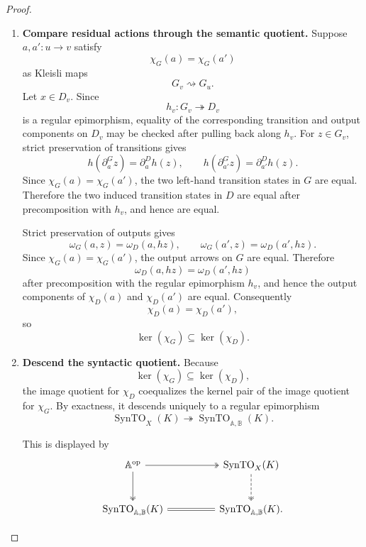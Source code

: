\begin{proof}
    \leavevmode
    \begin{enumerate}
        \item \textbf{Compare residual actions through the semantic quotient.}
        Suppose \(a,a':u\to v\) satisfy
        \[
            \chi_G(a)=\chi_G(a')
        \]
        as Kleisli maps
        \[
            G_v\rightsquigarrow G_u.
        \]
        Let \(x\in D_v\). Since
        \[
            h_v:G_v\twoheadrightarrow D_v
        \]
        is a regular epimorphism, equality of the corresponding transition and
        output components on \(D_v\) may be checked after pulling back along
        \(h_v\). For \(z\in G_v\), strict preservation of transitions gives
        \[
            h(\partial_a^G z)=\partial_a^D h(z),
            \qquad
            h(\partial_{a'}^G z)=\partial_{a'}^D h(z).
        \]
        Since \(\chi_G(a)=\chi_G(a')\), the two left-hand transition states in
        \(G\) are equal. Therefore the two induced transition states in \(D\)
        are equal after precomposition with \(h_v\), and hence are equal.

        Strict preservation of outputs gives
        \[
            \omega_G(a,z)=\omega_D(a,hz),
            \qquad
            \omega_G(a',z)=\omega_D(a',hz).
        \]
        Since \(\chi_G(a)=\chi_G(a')\), the output arrows on \(G\) are equal.
        Therefore
        \[
            \omega_D(a,hz)=\omega_D(a',hz)
        \]
        after precomposition with the regular epimorphism \(h_v\), and hence the
        output components of \(\chi_D(a)\) and \(\chi_D(a')\) are equal.
        Consequently
        \[
            \chi_D(a)=\chi_D(a'),
        \]
        so
        \[
            \ker(\chi_G)\subseteq\ker(\chi_D).
        \]

        \item \textbf{Descend the syntactic quotient.}
        Because
        \[
            \ker(\chi_G)\subseteq\ker(\chi_D),
        \]
        the image quotient for \(\chi_D\) coequalizes the kernel pair of the
        image quotient for \(\chi_G\). By exactness, it descends uniquely to a
        regular epimorphism
        \[
            \operatorname{SynTO}_X(K)
            \twoheadrightarrow
            \operatorname{SynTO}_{\mathbb A,\mathbb B}(K).
        \]

        This is displayed by
        \[
        \begin{tikzcd}[column sep=huge, row sep=large]
            \mathbb A^{\mathrm{op}}
                \arrow[r, two heads]
                \arrow[d, two heads]
            &
            \operatorname{SynTO}_X(K)
                \arrow[d, dashed, two heads]
            \\
            \operatorname{SynTO}_{\mathbb A,\mathbb B}(K)
                \arrow[r, equal]
            &
            \operatorname{SynTO}_{\mathbb A,\mathbb B}(K).
        \end{tikzcd}
        \]


\end{enumerate}
\end{proof}
